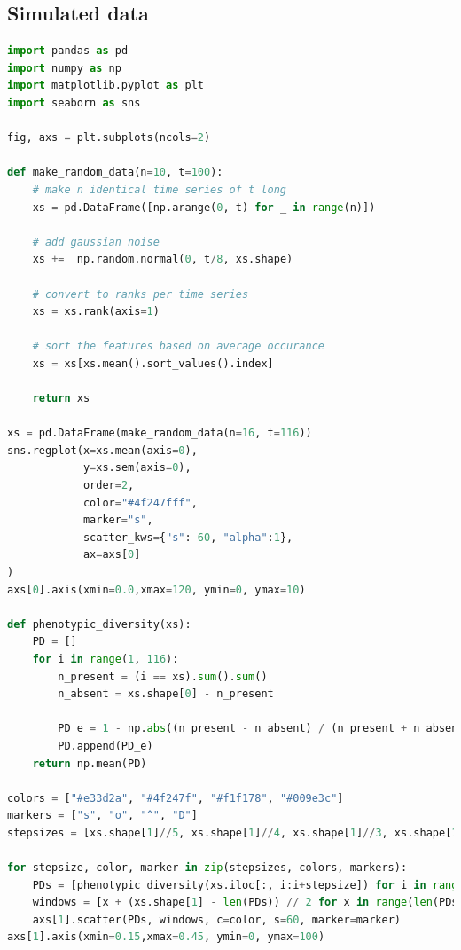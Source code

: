 \subsection{Simulated data}

\begin{lstlisting}[language=Python]
import pandas as pd
import numpy as np
import matplotlib.pyplot as plt
import seaborn as sns

fig, axs = plt.subplots(ncols=2)

def make_random_data(n=10, t=100):
    # make n identical time series of t long
    xs = pd.DataFrame([np.arange(0, t) for _ in range(n)])
    
    # add gaussian noise
    xs +=  np.random.normal(0, t/8, xs.shape) 
    
    # convert to ranks per time series
    xs = xs.rank(axis=1)
    
    # sort the features based on average occurance
    xs = xs[xs.mean().sort_values().index]
    
    return xs

xs = pd.DataFrame(make_random_data(n=16, t=116))
sns.regplot(x=xs.mean(axis=0), 
            y=xs.sem(axis=0),
            order=2,
            color="#4f247fff", 
            marker="s",
            scatter_kws={"s": 60, "alpha":1},
            ax=axs[0]
)
axs[0].axis(xmin=0.0,xmax=120, ymin=0, ymax=10)

def phenotypic_diversity(xs):
    PD = []
    for i in range(1, 116):
        n_present = (i == xs).sum().sum()
        n_absent = xs.shape[0] - n_present

        PD_e = 1 - np.abs((n_present - n_absent) / (n_present + n_absent))
        PD.append(PD_e)
    return np.mean(PD)

colors = ["#e33d2a", "#4f247f", "#f1f178", "#009e3c"]
markers = ["s", "o", "^", "D"]
stepsizes = [xs.shape[1]//5, xs.shape[1]//4, xs.shape[1]//3, xs.shape[1]//2]

for stepsize, color, marker in zip(stepsizes, colors, markers):
    PDs = [phenotypic_diversity(xs.iloc[:, i:i+stepsize]) for i in range(0, xs.shape[1] - stepsize)]
    windows = [x + (xs.shape[1] - len(PDs)) // 2 for x in range(len(PDs))]
    axs[1].scatter(PDs, windows, c=color, s=60, marker=marker)
axs[1].axis(xmin=0.15,xmax=0.45, ymin=0, ymax=100)
\end{lstlisting}

